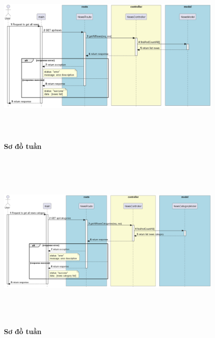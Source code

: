 \documentclass{article}%
\begin{document}
\begin{figure}[H]
  \centering
  \includegraphics[width=16cm,height=9cm]{Images/server/sequence/server/getAllNews.png}
  \caption[Sơ đồ tuần tự ]{\bfseries \fontsize{12pt}{0pt}
  \selectfont Sơ đồ tuần }
  \label{hinh21} %
\end{figure}

\begin{figure}[H]
  \centering
  \includegraphics[width=16cm,height=9cm]{Images/server/sequence/server/getAllNewsCategories.png}
  \caption[Sơ đồ tuần tự ]{\bfseries \fontsize{12pt}{0pt}
  \selectfont Sơ đồ tuần }
  \label{hinh21} %
\end{figure}
\end{document}

